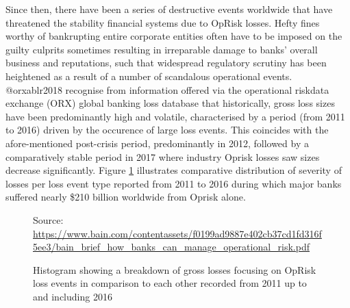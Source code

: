 \documentclass[
]{article}
\begin{document}
Since then, there have been a series of destructive events worldwide
that have threatened the stability financial systems due to OpRisk
losses. Hefty fines worthy of bankrupting entire corporate entities
often have to be imposed on the guilty culprits sometimes resulting in
irreparable damage to banks' overall business and reputations, such that
widespread regulatory scrutiny has been heightened as a result of a
number of scandalous operational events. @orxablr2018 recognise from
information offered via the operational riskdata exchange (ORX) global
banking loss database that historically, gross loss sizes have been
predominantly high and volatile, characterised by a period (from 2011 to
2016) driven by the occurence of large loss events. This coincides with
the afore-mentioned post-crisis period, predominantly in 2012, followed
by a comparatively stable period in 2017 where industry Oprisk losses
saw sizes decrease significantly. Figure \ref{bank-oprisk_fig}
illustrates comparative distribution of severity of losses per loss
event type reported from 2011 to 2016 during which major banks suffered
nearly \$210 billion worldwide from Oprisk alone.\medskip

\begin{figure}
\centering
{}
             {Source: \url{https://www.bain.com/contentassets/f0199ad9887e402cb37cd1fd316f5ee3/bain_brief_how_banks_can_manage_operational_risk.pdf}}
\caption[Losses suffered from 2011 to 2016 from Oprisk]{Histogram showing a breakdown of gross losses focusing on OpRisk loss events in comparison to each other recorded from 2011 up to and including 2016}
\label{bank-oprisk_fig}
\end{figure}
\end{document}
